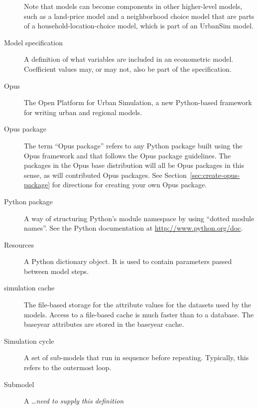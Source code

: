 \begin{description}
Note that models can become components in other higher-level models, such as a
land-price model and a neighborhood choice model that are parts of a
household-location-choice model, which is part of an UrbanSim model.

\item[Model specification] 
A definition of what variables are included in an econometric
model.  Coefficient \coefficientsindex values may, or may not, also be part of the
specification.

\item[Opus]  The Open Platform for Urban Simulation, a new
Python-based \pythonindex framework for writing urban and regional models.

\item[Opus package]  The term ``Opus package'' refers to 
any Python \pythonindex package built using the Opus framework and that follows
the Opus package guidelines.  The packages in the Opus base distribution
will all be Opus packages in this sense, as will contributed Opus packages. See
Section~\ref{sec:create-opus-package} for directions for creating your own Opus
package. 

\item[Python package] \pythonpackagesindex
A way of structuring Python's \pythonindex module namespace by using ``dotted module
names''.  See the Python \pythonindex documentation at \url{http://www.python.org/doc}.

\item[Resources]  
A Python \pythonindex dictionary object.  It is used to contain parameters passed
between model steps.

\item[simulation cache] \simulationcacheindex
The file-based storage for the attribute values for the datasets \datasetindex used by the
models. Access to a file-based cache is much faster than to a database.  The
baseyear attributes \attributesindex are stored in the baseyear cache. \baseyearcacheindex

\item[]\item[Simulation cycle] 
A set of sub-models that run in sequence before repeating.
Typically, this refers to the outermost loop.

\item[Submodel] 
A \ldots \emph{need to supply this definition}


\end{description}
